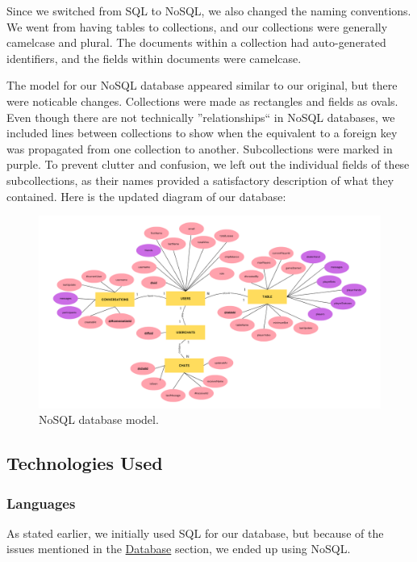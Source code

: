 Since we switched from SQL to NoSQL, we also changed the naming conventions. We went from having tables to collections, and our collections were generally camelcase and plural. The documents within a collection had auto-generated identifiers, and the fields within documents were camelcase.

The model for our NoSQL database appeared similar to our original, but there were noticable changes. Collections were made as rectangles and fields as ovals. Even though there are not technically ''relationships`` in NoSQL databases, we included lines between collections to show when the equivalent to a foreign key was propagated from one collection to another. Subcollections were marked in purple. To prevent clutter and confusion, we left out the individual fields of these subcollections, as their names provided a satisfactory description of what they contained. Here is the updated diagram of our database:

\begin{figure}[hbt!]
    \centering
    \includegraphics[width=1.0\linewidth]{figures/NoSQL_Database_Model.png}
    \caption{NoSQL database model.}
    \label{fig:ERD}
\end{figure}


\pagebreak

\subsection{Technologies Used}

\subsubsection{Languages}
As stated earlier, we initially used SQL for our database, but because of the issues mentioned in the \hyperref[sec:database]{Database} section, we ended up using NoSQL. 

